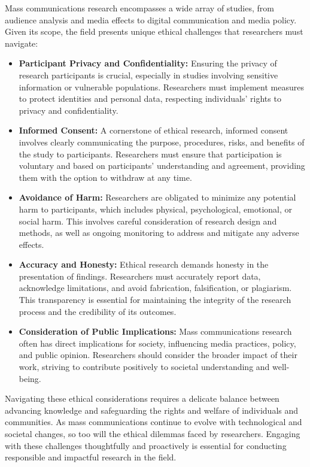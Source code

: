 \documentclass[
]{book}
\begin{document}
Mass communications research encompasses a wide array of studies, from audience analysis and media effects to digital communication and media policy. Given its scope, the field presents unique ethical challenges that researchers must navigate:

\begin{itemize}
\item
  \textbf{Participant Privacy and Confidentiality:} Ensuring the privacy of research participants is crucial, especially in studies involving sensitive information or vulnerable populations. Researchers must implement measures to protect identities and personal data, respecting individuals' rights to privacy and confidentiality.
\item
  \textbf{Informed Consent:} A cornerstone of ethical research, informed consent involves clearly communicating the purpose, procedures, risks, and benefits of the study to participants. Researchers must ensure that participation is voluntary and based on participants' understanding and agreement, providing them with the option to withdraw at any time.
\item
  \textbf{Avoidance of Harm:} Researchers are obligated to minimize any potential harm to participants, which includes physical, psychological, emotional, or social harm. This involves careful consideration of research design and methods, as well as ongoing monitoring to address and mitigate any adverse effects.
\item
  \textbf{Accuracy and Honesty:} Ethical research demands honesty in the presentation of findings. Researchers must accurately report data, acknowledge limitations, and avoid fabrication, falsification, or plagiarism. This transparency is essential for maintaining the integrity of the research process and the credibility of its outcomes.
\item
  \textbf{Consideration of Public Implications:} Mass communications research often has direct implications for society, influencing media practices, policy, and public opinion. Researchers should consider the broader impact of their work, striving to contribute positively to societal understanding and well-being.
\end{itemize}

Navigating these ethical considerations requires a delicate balance between advancing knowledge and safeguarding the rights and welfare of individuals and communities. As mass communications continue to evolve with technological and societal changes, so too will the ethical dilemmas faced by researchers. Engaging with these challenges thoughtfully and proactively is essential for conducting responsible and impactful research in the field.
\end{document}
